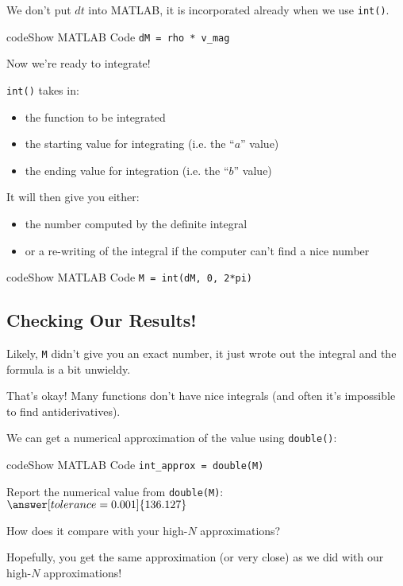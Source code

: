\documentclass{ximera}
\begin{document}
\begin{remark}
We don't put $dt$ into MATLAB, it is incorporated already when we use \texttt{int()}.
\end{remark}

\begin{expandable}{code}{Show MATLAB Code}
\texttt{dM = rho * v\_mag}
\end{expandable}

Now we're ready to integrate!

\texttt{int()} takes in:
\begin{itemize}
\item the function to be integrated
\item the starting value for integrating (i.e. the ``$a$'' value)
\item the ending value for integration (i.e. the ``$b$'' value)
\end{itemize}

It will then give you either:
\begin{itemize}
\item the number computed by the definite integral
\item or a re-writing of the integral if the computer can't find a nice number
\end{itemize}

\begin{expandable}{code}{Show MATLAB Code}
\texttt{M = int(dM, 0, 2*pi)}
\end{expandable}

\subsection*{Checking Our Results!}

Likely, \texttt{M} didn't give you an exact number, it just wrote out the integral and the formula is a bit unwieldy.

That's okay! Many functions don't have nice integrals (and often it's impossible to find antiderivatives).

We can get a numerical approximation of the value using \texttt{double()}:

\begin{expandable}{code}{Show MATLAB Code}
\texttt{int\_approx = double(M)}
\end{expandable}

\begin{problem}
Report the numerical value from \texttt{double(M)}: $\answer[tolerance=0.001]{136.127}$

How does it compare with your high-$N$ approximations? \begin{multipleChoice}
\end{multipleChoice}

Hopefully, you get the same approximation (or very close) as we did with our high-$N$ approximations!
\end{problem}
\end{document}
